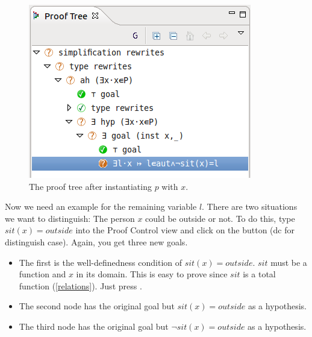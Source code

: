 \begin{figure}[!ht]
\begin{center}
	\includegraphics{img/tutorial/tut_10_proof_tree.png}
	\caption{The proof tree after instantiating $p$ with $x$.}
	\label{fig_tut_10_proof_tree}
\end{center}
\end{figure}

Now we need an example for the remaining variable $l$.
There are two situations we want to distinguish: The person $x$ could be outside or not.
To do this, type $sit(x) = outside$ into the \textsf{Proof Control} view and click on the button  (\textsf{dc} for distinguish case).
Again, you get three new goals.

\begin{itemize}
\item The first is the well-definedness condition of $sit(x) = outside$. $sit$ must be a function and $x$ in its domain.
  This is easy to prove since $sit$ is a total function (\ref{relations}). Just press .
\item The second node has the original goal but $sit(x) = outside$ as a hypothesis.
\item The third node has the original goal but $\lnot sit(x) = outside$ as a hypothesis.
\end{itemize}


